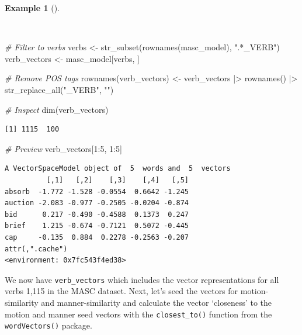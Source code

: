 \documentclass[
  letterpaper,
]{latex/krantz}
\newenvironment{Shaded}{\begin{snugshade}}{\end{snugshade}}
\newcommand{\CommentTok}[1]{\textcolor[rgb]{0.00,0.00,0.00}{\textit{#1}}}
\newcommand{\DecValTok}[1]{\textcolor[rgb]{0.00,0.00,0.00}{#1}}
\newcommand{\FunctionTok}[1]{\textcolor[rgb]{0.00,0.00,0.00}{#1}}
\newcommand{\NormalTok}[1]{\textcolor[rgb]{0.00,0.00,0.00}{#1}}
\newcommand{\OtherTok}[1]{\textcolor[rgb]{0.00,0.00,0.00}{#1}}
\newcommand{\SpecialCharTok}[1]{\textcolor[rgb]{0.00,0.00,0.00}{#1}}
\newcommand{\StringTok}[1]{\textcolor[rgb]{0.00,0.00,0.00}{#1}}
\theoremstyle{definition}
\newtheorem{example}{Example}[chapter]
\theoremstyle{remark}
\begin{document}
\begin{example}[]\protect\hypertarget{exm-explore-masc-vsm-word2vec-verbs}{}\label{exm-explore-masc-vsm-word2vec-verbs}

~

\begin{Shaded}
\begin{Highlighting}[]
\CommentTok{\# Filter to verbs}
\NormalTok{verbs }\OtherTok{\textless{}{-}} \FunctionTok{str\_subset}\NormalTok{(}\FunctionTok{rownames}\NormalTok{(masc\_model), }\StringTok{".*\_VERB"}\NormalTok{)}
\NormalTok{verb\_vectors }\OtherTok{\textless{}{-}}\NormalTok{ masc\_model[verbs, ]}

\CommentTok{\# Remove POS tags}
\FunctionTok{rownames}\NormalTok{(verb\_vectors) }\OtherTok{\textless{}{-}}
\NormalTok{  verb\_vectors }\SpecialCharTok{|\textgreater{}}
  \FunctionTok{rownames}\NormalTok{() }\SpecialCharTok{|\textgreater{}}
  \FunctionTok{str\_replace\_all}\NormalTok{(}\StringTok{"\_VERB"}\NormalTok{, }\StringTok{""}\NormalTok{)}

\CommentTok{\# Inspect}
\FunctionTok{dim}\NormalTok{(verb\_vectors)}
\end{Highlighting}
\end{Shaded}

\begin{verbatim}
[1] 1115  100
\end{verbatim}

\begin{Shaded}
\begin{Highlighting}[]
\CommentTok{\# Preview}
\NormalTok{verb\_vectors[}\DecValTok{1}\SpecialCharTok{:}\DecValTok{5}\NormalTok{, }\DecValTok{1}\SpecialCharTok{:}\DecValTok{5}\NormalTok{]}
\end{Highlighting}
\end{Shaded}

\begin{verbatim}
A VectorSpaceModel object of  5  words and  5  vectors
          [,1]   [,2]    [,3]    [,4]   [,5]
absorb  -1.772 -1.528 -0.0554  0.6642 -1.245
auction -2.083 -0.977 -0.2505 -0.0204 -0.874
bid      0.217 -0.490 -0.4588  0.1373  0.247
brief    1.215 -0.674 -0.7121  0.5072 -0.445
cap     -0.135  0.884  0.2278 -0.2563 -0.207
attr(,".cache")
<environment: 0x7fc543f4ed38>
\end{verbatim}

\end{example}

We now have \texttt{verb\_vectors} which includes the vector
representations for all verbs 1,115 in the MASC dataset. Next, let's
seed the vectors for motion-similarity and manner-similarity and
calculate the vector `closeness' to the motion and manner seed vectors
with the \texttt{closest\_to()} function from the \texttt{wordVectors()}
package.
\end{document}
